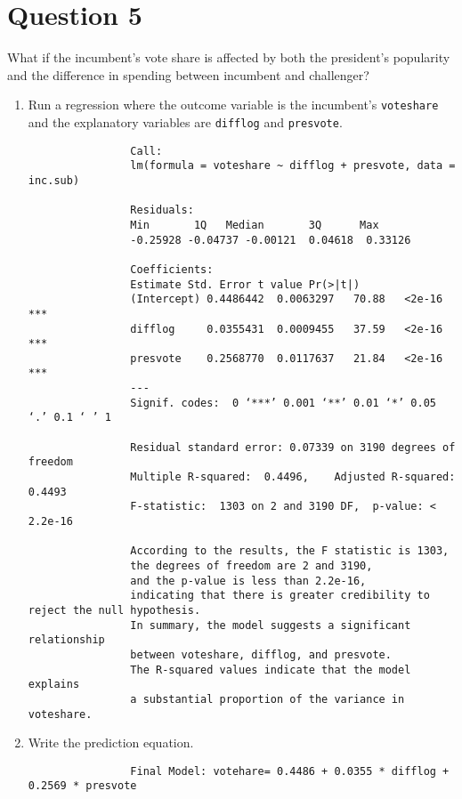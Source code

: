\documentclass[12pt,letterpaper]{article}
\begin{document}
\section*{Question 5}
\noindent What if the incumbent's vote share is affected by both the president's popularity and the difference in spending between incumbent and challenger? 
	\begin{enumerate}
		\item Run a regression where the outcome variable is the incumbent's \texttt{voteshare} and the explanatory variables are \texttt{difflog} and \texttt{presvote}.
		
		\vspace{.15cm}
		
		\vspace{.15cm}
			\begin{footnotesize}
			\begin{verbatim}
				Call:
				lm(formula = voteshare ~ difflog + presvote, data = inc.sub)
				
				Residuals:
				Min       1Q   Median       3Q      Max 
				-0.25928 -0.04737 -0.00121  0.04618  0.33126 
				
				Coefficients:
				Estimate Std. Error t value Pr(>|t|)    
				(Intercept) 0.4486442  0.0063297   70.88   <2e-16 ***
				difflog     0.0355431  0.0009455   37.59   <2e-16 ***
				presvote    0.2568770  0.0117637   21.84   <2e-16 ***
				---
				Signif. codes:  0 ‘***’ 0.001 ‘**’ 0.01 ‘*’ 0.05 ‘.’ 0.1 ‘ ’ 1
				
				Residual standard error: 0.07339 on 3190 degrees of freedom
				Multiple R-squared:  0.4496,	Adjusted R-squared:  0.4493 
				F-statistic:  1303 on 2 and 3190 DF,  p-value: < 2.2e-16
				
				According to the results, the F statistic is 1303, 
				the degrees of freedom are 2 and 3190, 
				and the p-value is less than 2.2e-16, 
				indicating that there is greater credibility to reject the null hypothesis.
				In summary, the model suggests a significant relationship 
				between voteshare, difflog, and presvote. 
				The R-squared values indicate that the model explains 
				a substantial proportion of the variance in voteshare.
			\end{verbatim}
		\end{footnotesize}	
		\item Write the prediction equation.	
		\vspace{.15cm}
		
		\vspace{.15cm}
		\begin{footnotesize}
			\begin{verbatim}
				Final Model: votehare= 0.4486 + 0.0355 * difflog + 0.2569 * presvote
			\end{verbatim}
		\end{footnotesize}	
		

\end{enumerate}
\end{document}
